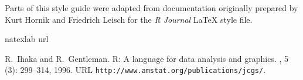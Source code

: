Parts of this style guide were adapted from documentation originally
prepared by Kurt Hornik and Friedrich Leisch for the \emph{R Journal}
\LaTeX{} style file.

\begin{thebibliography}{1}
\expandafter\ifx\csname natexlab\endcsname\relax\def\natexlab#1{#1}\fi
\expandafter\ifx\csname url\endcsname\relax
  \def\url#1{{\tt #1}}\fi

R.~Ihaka and R.~Gentleman.
\newblock R: A language for data analysis and graphics.
, 5
  (3): 299--314, 1996.
\newblock URL \url{http://www.amstat.org/publications/jcgs/}.

\end{thebibliography}



